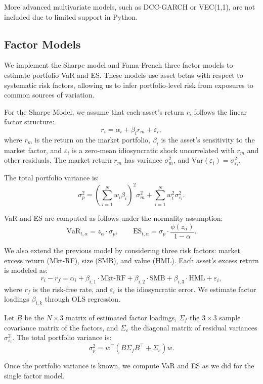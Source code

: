 \documentclass{article}
\begin{document}
More advanced multivariate models, such as DCC-GARCH or VEC(1,1), are not included due to limited support in Python.



\subsection{Factor Models}


We implement the Sharpe model and Fama-French three factor models to estimate portfolio VaR and ES. These models use asset betas with respect to systematic risk factors, allowing us to infer portfolio-level risk from exposures to common sources of variation.

For the Sharpe Model, we assume that each asset’s return $r_i$ follows the linear factor structure:
\[
r_i = \alpha_i + \beta_i r_m + \varepsilon_i,
\]
where $r_m$ is the return on the market portfolio, $\beta_i$ is the asset's sensitivity to the market factor, and $\varepsilon_i$ is a zero-mean idiosyncratic shock uncorrelated with $r_m$ and other residuals. The market return $r_m$ has variance $\sigma_m^2$, and $\mathrm{Var}(\varepsilon_i) = \sigma_{\varepsilon_i}^2$.

The total portfolio variance is:
\[
\sigma_p^2 = \left(\sum_{i=1}^N w_i \beta_i\right)^2 \sigma_m^2 + \sum_{i=1}^N w_i^2 \sigma_{\varepsilon_i}^2.
\]

VaR and ES are computed as follows under the normality assumption:
\[
\text{VaR}_{t,\alpha} = z_\alpha \cdot \sigma_p, \qquad
\text{ES}_{t,\alpha} = \sigma_p \cdot \frac{\phi(z_\alpha)}{1 - \alpha}.
\]
 
We also extend the previous model by considering three risk factors: market excess return (Mkt-RF), size (SMB), and value (HML). Each asset’s excess return is modeled as:
\[
r_i - r_f = \alpha_i + \beta_{i,1} \cdot \text{Mkt-RF} + \beta_{i,2} \cdot \text{SMB} + \beta_{i,3} \cdot \text{HML} + \varepsilon_i,
\]
where $r_f$ is the risk-free rate, and $\varepsilon_i$ is the idiosyncratic error. We estimate factor loadings $\beta_{i,k}$ through OLS regression.

Let $B$ be the $N \times 3$ matrix of estimated factor loadings, $\Sigma_f$ the $3 \times 3$ sample covariance matrix of the factors, and $\Sigma_\varepsilon$ the diagonal matrix of residual variances $\sigma_{\varepsilon_i}^2$. The total portfolio variance is:
\[
\sigma_p^2 = w^\top (B \Sigma_f B^\top + \Sigma_\varepsilon) w.
\]

Once the portfolio variance is known, we compute VaR and ES as we did for the single factor model.
\end{document}
